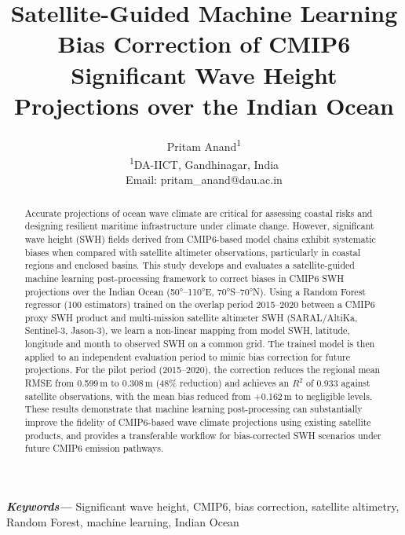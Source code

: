 \documentclass[twocolumn]{article}
\newenvironment{IEEEkeywords}{\vspace{1em}\noindent\textbf{\textit{Keywords---}}}{\vspace{1em}}
\newcommand{\SI}[2]{#1\,#2}
\begin{document}
\title{Satellite-Guided Machine Learning Bias Correction of CMIP6 Significant Wave Height Projections over the Indian Ocean}

\author{%
  Pritam Anand\textsuperscript{1}\\%
  \textsuperscript{1}DA-IICT, Gandhinagar, India\\%
  Email: pritam\_anand@dau.ac.in%
}

\maketitle

\begin{abstract}
Accurate projections of ocean wave climate are critical for assessing coastal risks and designing resilient maritime infrastructure under climate change. However, significant wave height (SWH) fields derived from CMIP6-based model chains exhibit systematic biases when compared with satellite altimeter observations, particularly in coastal regions and enclosed basins. This study develops and evaluates a satellite-guided machine learning post-processing framework to correct biases in CMIP6 SWH projections over the Indian Ocean (50°--110°E, 70°S--70°N). Using a Random Forest regressor (100 estimators) trained on the overlap period 2015--2020 between a CMIP6 proxy SWH product and multi-mission satellite altimeter SWH (SARAL/AltiKa, Sentinel-3, Jason-3), we learn a non-linear mapping from model SWH, latitude, longitude and month to observed SWH on a common grid. The trained model is then applied to an independent evaluation period to mimic bias correction for future projections. For the pilot period (2015--2020), the correction reduces the regional mean RMSE from \SI{0.599}{m} to \SI{0.308}{m} (48\% reduction) and achieves an $R^2$ of 0.933 against satellite observations, with the mean bias reduced from \SI{+0.162}{m} to negligible levels. These results demonstrate that machine learning post-processing can substantially improve the fidelity of CMIP6-based wave climate projections using existing satellite products, and provides a transferable workflow for bias-corrected SWH scenarios under future CMIP6 emission pathways.
\end{abstract}

\begin{IEEEkeywords}
Significant wave height, CMIP6, bias correction, satellite altimetry, Random Forest, machine learning, Indian Ocean
\end{IEEEkeywords}
\end{document}
